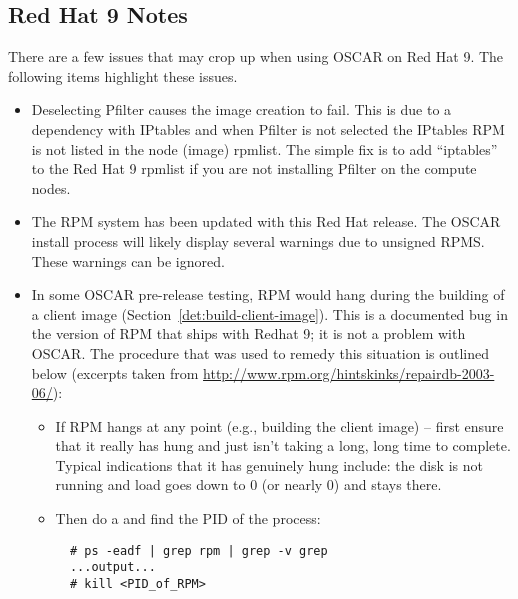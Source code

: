 
\subsection{Red Hat 9 Notes}
\label{subsec:rh90notes}

There are a few issues that may crop up when using OSCAR on Red Hat 9.
The following items highlight these issues.

\begin{itemize}

\item Deselecting Pfilter causes the image creation to fail.  This is
  due to a dependency with IPtables and when Pfilter is not selected
  the IPtables RPM is not listed in the node (image) rpmlist.   The simple
  fix is to add ``iptables'' to the Red Hat 9 rpmlist if you are not
  installing Pfilter on the compute nodes.

\item The RPM system has been updated with this Red Hat release.  The
 OSCAR install process will likely display several warnings due to unsigned
 RPMS.  These warnings can be ignored. 

\item In some OSCAR pre-release testing, RPM would hang during the
  building of a client image (Section~\ref{det:build-client-image}).
  This is a documented bug in the version of RPM that ships with
  Redhat 9; it is not a problem with OSCAR.  The procedure
  that was used to remedy this situation is outlined below (excerpts
  taken from \url{http://www.rpm.org/hintskinks/repairdb-2003-06/}):
        \begin{itemize}
        \item If RPM hangs at any point (e.g., building the client
          image) -- first ensure that it really has hung and just
          isn't taking a long, long time to complete.  Typical
          indications that it has genuinely hung include: the disk is
          not running and load goes down to 0 (or nearly 0) and stays
          there.
          
        \item Then do a  and find the PID of the 
          process:
\begin{verbatim}
  # ps -eadf | grep rpm | grep -v grep
  ...output...
  # kill <PID_of_RPM>
\end{verbatim}
          

\end{itemize}
\end{itemize}
